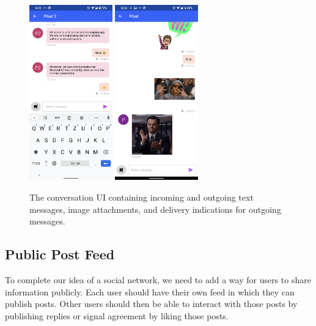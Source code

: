 \begin{figure}
    \centering
    \includegraphics[width=0.32\textwidth]{screens/superapp/conversation_text}
    \includegraphics[width=0.32\textwidth]{screens/superapp/conversation}
    \caption{The conversation UI containing incoming and outgoing text messages, image attachments, and delivery indications for outgoing messages.}
    \label{peerchat_conversation}
\end{figure}

\subsection{Public Post Feed}

To complete our idea of a social network, we need to add a way for users to share information publicly. Each user should have their own feed in which they can publish posts. Other users should then be able to interact with those posts by publishing replies or signal agreement by liking those posts.

